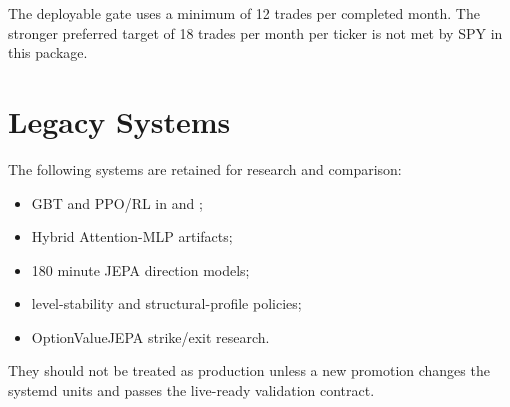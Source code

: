 \documentclass[11pt,a4paper]{article}
\begin{document}
The deployable gate uses a minimum of 12 trades per completed month. The stronger preferred target of 18 trades per month per ticker is not met by SPY in this package.

\section{Legacy Systems}

The following systems are retained for research and comparison:

\begin{itemize}
  \item GBT and PPO/RL in  and ;
  \item Hybrid Attention-MLP artifacts;
  \item 180 minute JEPA direction models;
  \item level-stability and structural-profile policies;
  \item OptionValueJEPA strike/exit research.
\end{itemize}

They should not be treated as production unless a new promotion changes the systemd units and passes the live-ready validation contract.
\end{document}

